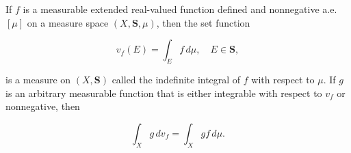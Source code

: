 If $f$ is a measurable extended real-valued function defined and nonnegative a.e. $[\mu]$ on a measure space $(X, \mathbf{S}, \mu)$, then the set function

$$v_f(E) = \int_E f \, d\mu, \quad E \in \mathbf{S},$$

is a measure on $(X, \mathbf{S})$ called the indefinite integral of $f$ with respect to $\mu$. If $g$ is an arbitrary measurable function that is either integrable with respect to $v_f$ or nonnegative, then

$$\int_X g \, dv_f = \int_X gf \, d\mu.$$
